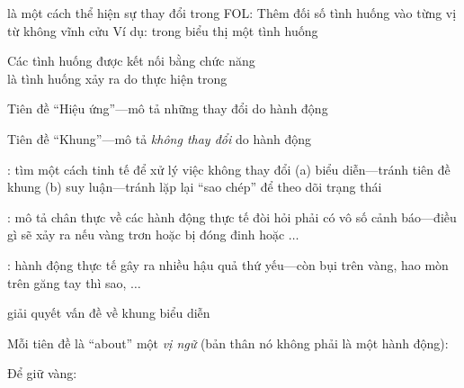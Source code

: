 \documentclass{article}
\begin{document}
\begin{huge}
 là một cách thể hiện sự thay đổi trong FOL:\nl
   Thêm đối số tình huống vào từng vị từ không vĩnh cửu\nl
   Ví dụ:  trong  biểu thị một tình huống

Các tình huống được kết nối bằng chức năng \\
 là tình huống xảy ra do thực hiện  trong 

\textwidth
{}




Tiên đề ``Hiệu ứng''---mô tả những thay đổi do hành động\\

Tiên đề ``Khung''---mô tả \emph{không thay đổi} do hành động\\

: tìm một cách tinh tế để xử lý việc không thay đổi\nl
   (a) biểu diễn---tránh tiên đề khung\nl
   (b) suy luận---tránh lặp lại ``sao chép'' để theo dõi trạng thái

: mô tả chân thực về các hành động thực tế đòi hỏi phải có vô số cảnh báo---điều gì sẽ xảy ra nếu vàng trơn hoặc bị đóng đinh hoặc $\ldots$

: hành động thực tế gây ra nhiều hậu quả thứ yếu---còn bụi trên vàng, hao mòn trên găng tay thì sao, $\ldots$



 giải quyết vấn đề về khung biểu diễn 

Mỗi tiên đề là ``about'' một \emph{vị ngữ} (bản thân nó không phải là một hành động):

Để giữ vàng:\al
   \nl
      \mat{$[(a\eq Grab \land AtGold(s))$}\nl
      \mat{${}\lor (Holding(Gold,s) \land a\neq Release)]$}



\end{huge}
\end{document}
